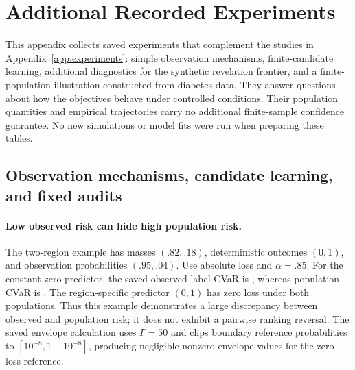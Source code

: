 \section{Additional Recorded Experiments}
\label{app:f}\label{app:additional-experiments}


This appendix collects saved experiments that complement the studies in
Appendix~\ref{app:experiments}: simple observation mechanisms, finite-candidate
learning, additional diagnostics for the synthetic revelation frontier, and a
finite-population illustration constructed from diabetes data. They answer
questions about how the objectives behave under controlled conditions. Their
population quantities and empirical trajectories carry no additional
finite-sample confidence guarantee. No new simulations or model fits were run
when preparing these tables.

\subsection{Observation mechanisms, candidate learning, and fixed audits}
\label{app:additional-mechanisms}

\paragraph{Low observed risk can hide high population risk.}
The two-region example has masses $(.82,.18)$, deterministic outcomes $(0,1)$,
and observation probabilities $(.95,.04)$. Use absolute loss and $\alpha=.85$.
For the constant-zero predictor, the saved observed-label CVaR is
\AdditionalHiddenObserved{}, whereas population CVaR is
\AdditionalHiddenFull{}. The region-specific predictor $(0,1)$ has zero loss
under both populations. Thus this example demonstrates a large discrepancy
between observed and population risk; it does not exhibit a pairwise ranking
reversal. The saved envelope calculation uses $\Gamma=50$ and clips boundary
reference probabilities to $[10^{-8},1-10^{-8}]$, producing negligible nonzero
envelope values for the zero-loss reference.

